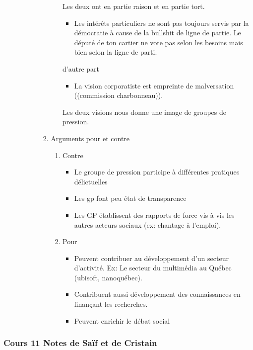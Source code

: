 \documentclass[11pt]{article}
\begin{document}
\begin{enumerate}
\begin{enumerate}
\begin{enumerate}
\begin{enumerate}
\begin{enumerate}
Les deux ont en partie raison et en partie tort.

\begin{itemize}
\item Les intérêts particuliers ne sont pas toujours servis par la démocratie à
cause de la bullshit de ligne de partie.  Le député de ton cartier ne vote pas
selon les besoins mais bien selon la ligne de parti.
\end{itemize}

d'autre part

\begin{itemize}
\item La vision corporatiste est empreinte de malversation ((commission charbonneau)).
\end{itemize}


Les deux visions nous donne une image de groupes de pression.
\end{enumerate}

\item Arguments pour et contre
\label{sec:orgcd510ba}

\begin{enumerate}
\item Contre
\label{sec:org941fc2a}
\begin{itemize}
\item Le groupe de pression participe à différentes pratiques délictuelles
\item Les gp font peu état de transparence
\item Les GP établissent des rapports de force vis à vis les autres acteurs sociaux
(ex: chantage à l'emploi).
\end{itemize}

\item Pour
\label{sec:org4d12bd8}
\begin{itemize}
\item Peuvent contribuer au développement d'un secteur d'activité. Ex: Le secteur du
multimédia au Québec (ubisoft, nanoquébec).
\item Contribuent aussi développement des connaissances en finançant les recherches.
\item Peuvent enrichir le débat social
\end{itemize}
\end{enumerate}
\end{enumerate}
\end{enumerate}
\end{enumerate}
\end{enumerate}
\subsubsection{Cours 11 Notes de Saïf et de Cristain}
\label{sec:orgb77347d}
\end{document}
